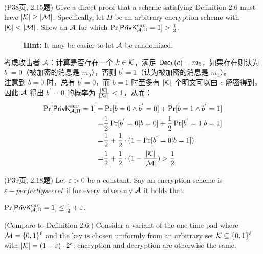 \begin{questions}
    \question (P38页, 2.15题) Give a direct proof that a scheme satisfying Definition 2.6 must have $|\mathcal{K}|\ge|\mathcal{M}|$. Specifically, let $\Pi$ be an arbitrary encryption scheme with $|\keyspace|<|\msgspace|$. Show an $\mathcal{A}$ for which $\Pr[\mathsf{PrivK}^{eav}_{\mathcal{A},\Pi}=1]>\frac{1}{2}$.

        \par $\text{ }\text{ }\text{ }\text{ }$\textbf{Hint:} It may be easier to let $\mathcal{A}$ be randomized.

        \begin{solution}
            \newline
            考虑攻击者 $\mathcal{A}$：计算是否存在一个 $k\in\mathcal{K}$，满足 $\mathsf{Dec}_k(c)=m_0$，如果存在则认为 $b^{'}=0$（被加密的消息是 $m_0$），否则 $b^{'}=1$（认为被加密的消息是 $m_1$）。\\
            注意到 $b=0$ 时，总有 $b^{'}=0$，而 $b=1$ 时至多有 $|\mathcal{K}|$ 个明文可以由 $c$ 解密得到，因此 $\mathcal{A}$ 得出 $b^{'}=0$ 的概率为 $\frac{|\mathcal{K}|}{|\mathcal{M}|}<1$，从而：
            \begin{equation}
                \begin{aligned}
                    \Pr[\mathsf{PrivK}^{eav}_{\mathcal{A},\Pi}=1]=&\Pr[b=0\wedge{b}^{'}=0]+\Pr[b=1\wedge{b}^{'}=1]\\
                    =&\frac{1}{2}\Pr[{b}^{'}=0|b=0]+\frac{1}{2}\Pr[{b}^{'}=1|b=1]\\
                    =&\frac{1}{2}+\frac{1}{2}\cdot(1-\Pr[{b}^{'}=0|b=1])\\
                    =&\frac{1}{2}+\frac{1}{2}\cdot(1-\frac{|\mathcal{K}|}{|\mathcal{M}|})>\frac{1}{2}
                \end{aligned}
            \end{equation}
        \end{solution}

    \question (P39页, 2.18题) Let $\varepsilon>0$ be a constant. Say an encryption scheme is $\varepsilon-perfectly secret$ if for every adversary $\mathcal{A}$ it holds that:

    \begin{center} $\Pr[\mathsf{PrivK}^{eav}_{\mathcal{A},\Pi}=1]\le\frac{1}{2}+\varepsilon$. \end{center}

    (Compare to Definition 2.6.) Consider a variant of the one-time pad where $\mathcal{M}=\{0,1\}^{\ell}$ and the key is chosen uniformly from an arbitrary set $\mathcal{K}\subseteq\{0,1\}^{\ell}$ with $|\mathcal{K}|=(1-\varepsilon)\cdot2^{\ell}$; encryption and decryption are otherwise the same.


\end{questions}
